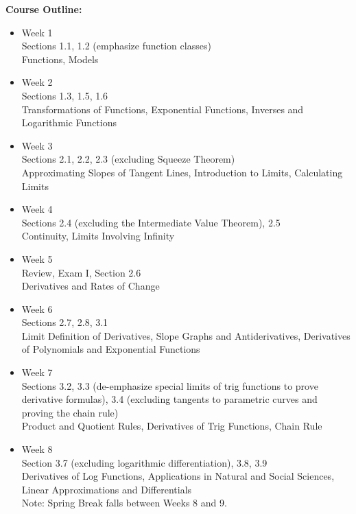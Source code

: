 \documentclass[12pt]{article}
\begin{document}
\vspace*{.15in}
\noindent \textbf{Course Outline:} 
\begin{itemize}
\item Week 1 \\
Sections 1.1, 1.2 (emphasize function classes) \\
Functions, Models 

\item Week 2 \\
Sections 1.3, 1.5, 1.6 \\
Transformations of Functions, Exponential Functions, Inverses and Logarithmic Functions

\item Week 3 \\
Sections 2.1, 2.2, 2.3 (excluding Squeeze Theorem) \\
Approximating Slopes of Tangent Lines, Introduction to Limits, Calculating Limits 

\item Week 4 \\
Sections 2.4 (excluding the Intermediate Value Theorem), 2.5 \\
Continuity, Limits Involving Infinity 

\item Week 5 \\
Review, Exam I, Section 2.6 \\
Derivatives and Rates of Change 

\item Week 6 \\
Sections 2.7, 2.8, 3.1 \\
Limit Definition of Derivatives, Slope Graphs and Antiderivatives, Derivatives of Polynomials and Exponential Functions 

\item Week 7 \\
Sections 3.2, 3.3 (de-emphasize special limits of trig functions to prove derivative formulas), 3.4 (excluding tangents to parametric curves and proving the chain rule) \\
Product and Quotient Rules, Derivatives of Trig Functions, Chain Rule 

\item Week 8 \\
Section 3.7 (excluding logarithmic differentiation), 3.8, 3.9 \\
Derivatives of Log Functions, Applications in Natural and Social Sciences, Linear Approximations and Differentials \\
Note: Spring Break falls between Weeks 8 and 9. 


\end{itemize}
\end{document}
